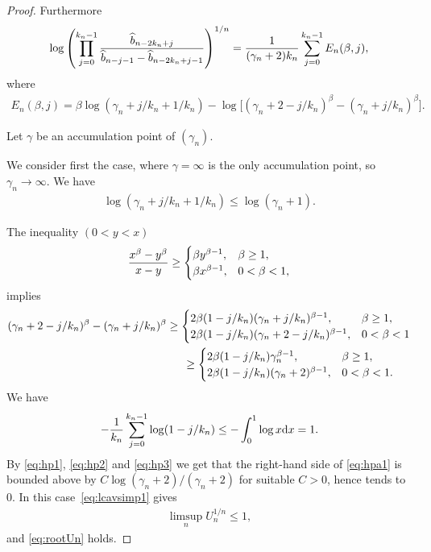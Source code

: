 \documentclass[pdftex]{sigma}
\numberwithin{equation}{section}
\begin{document}
\begin{proof}
Furthermore
\begin{gather}\label{eq:hpa1}
\log \left(\prod_{j=0}^{k_n-1} {\widehat{b}_{n-2k_n+j}\over \widehat{b}_{n-j-1}-\widehat{b}_{n-2k_n+j-1}}\right)^{1/n} =\frac{1}{(\gamma_n+2)k_n}\sum_{j=0}^{k_n-1} E_n(\beta,j),
\end{gather}
where
\begin{gather}\label{eq:hpa2}
E_n(\beta,j)= \beta\log (\gamma_n+{j/k_n}+1/k_n) -\log \big[(\gamma_n+2-{j/k_n} )^\beta - (\gamma_n+{j/ k_n})^\beta \big].
\end{gather}

Let $\gamma$ be an accumulation point of $(\gamma_n)$.

We consider first the case, where $\gamma=\infty$ is the only accumulation point, so $\gamma_n\to\infty$. We have
\begin{gather}\label{eq:hp1}
\log(\gamma_n+{j/ k_n}+1/k_n)\le \log(\gamma_n+1).
\end{gather}

The inequality $(0<y<x)$
\begin{gather*}
{x^\beta-y^\beta\over x-y}\ge \begin{cases}
 \beta y^{\beta-1}, & \beta\ge 1,\\
 \beta x^{\beta-1}, & 0<\beta<1,
 \end{cases}
\end{gather*}
implies
\begin{gather}
 (\gamma_n+2-{j/ k_n} )^\beta- (\gamma_n+{j/ k_n})^\beta \ge \begin{cases}
2\beta (1-j/k_n)(\gamma_n+{j/ k_n} )^{\beta-1},& \beta\ge 1, \\
2\beta (1-j/k_n)(\gamma_n+2-{j/ k_n} )^{\beta-1}, & 0<\beta<1
\end{cases} \nonumber\\
\hphantom{(\gamma_n+2-{j/ k_n} )^\beta- (\gamma_n+{j/ k_n})^\beta}{} \ge \begin{cases}
 2\beta (1-j/k_n)\gamma_n^{\beta-1}, &\beta \ge 1,\\
 2\beta (1-j/k_n)(\gamma_n+2)^{\beta-1}, & 0<\beta<1.
\end{cases}\label{eq:hp2}
\end{gather}
We have
\begin{gather}\label{eq:hp3}
-\frac{1}{k_n}\sum_{j=0}^{k_n-1}\log (1-j/k_n)\le -\int_0^1\log x{\rm d}x=1.
\end{gather}
By \eqref{eq:hp1}, \eqref{eq:hp2} and \eqref{eq:hp3} we get that the right-hand side of \eqref{eq:hpa1} is bounded above by $C\log(\gamma_n+2)/(\gamma_n+2)$ for suitable $C>0$, hence tends to 0. In this case~\eqref{eq:lcavsimp1} gives
\begin{gather*}
\limsup_n U_n^{1/n}\le 1,
\end{gather*}
and \eqref{eq:rootUn} holds.


\end{proof}
\end{document}
